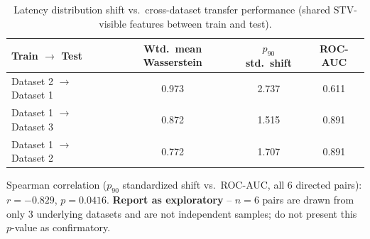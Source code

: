 \begin{table}[t]
\centering
\caption{Latency distribution shift vs.\ cross-dataset transfer performance
(shared STV-visible features between train and test).}
\label{tab:distribution-shift}
\begin{tabular}{lccc}
\toprule
\textbf{Train $\rightarrow$ Test} & \textbf{Wtd.\ mean Wasserstein} & \textbf{$p_{90}$ std.\ shift} & \textbf{ROC-AUC} \\
\midrule
Dataset 2 $\rightarrow$ Dataset 1 & 0.973 & 2.737 & 0.611 \\
Dataset 1 $\rightarrow$ Dataset 3 & 0.872 & 1.515 & 0.891 \\
Dataset 1 $\rightarrow$ Dataset 2 & 0.772 & 1.707 & 0.891 \\
\bottomrule
\end{tabular}

\vspace{4pt}
\footnotesize
Spearman correlation ($p_{90}$ standardized shift vs.\ ROC-AUC, all 6
directed pairs): $r = -0.829$, $p = 0.0416$. \textbf{Report as exploratory}
-- $n=6$ pairs are drawn from only 3 underlying datasets and are not
independent samples; do not present this $p$-value as confirmatory.
\end{table}
